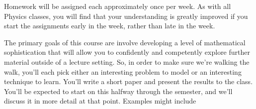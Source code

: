 \documentclass[12pt]{article}
\begin{document}
{\begin{description}
        Homework will be assigned each approximately once per week. As with
        all Physics classes, you will find that your understanding is greatly
        improved if you start the assignments early in the week, rather than
        late in the week.
        
        \newpage
  \item[Independent project:] The primary goals of this course are
        involve developing a level of mathematical sophistication that
        will allow you to confidently and competently explore further
        material outside of a lecture setting. So, in order to make
        sure we're walking the walk, you'll each pick either an
        interesting problem to model or an interesting technique to
        learn. You'll write a short paper and present the results to
        the class. You'll be expected to start on this halfway through
        the semester, and we'll discuss it in more detail at that
        point. Examples might include 


\end{description}}
\end{document}
